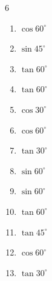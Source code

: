 \begin{multicols}{6}
\begin{enumerate}
  \item $\displaystyle \cos{60^\circ}$


  \item $\displaystyle \sin{45^\circ}$


  \item $\displaystyle \tan{60^\circ}$


  \item $\displaystyle \tan{60^\circ}$


  \item $\displaystyle \cos{30^\circ}$


  \item $\displaystyle \cos{60^\circ}$


\columnbreak %

  \item $\displaystyle \tan{30^\circ}$


  \item $\displaystyle \sin{60^\circ}$


  \item $\displaystyle \sin{60^\circ}$


  \item $\displaystyle \tan{60^\circ}$


  \item $\displaystyle \tan{45^\circ}$

        \phantom{$\displaystyle =1$}

  \item $\displaystyle \cos{60^\circ}$


  \item $\displaystyle \tan{30^\circ}$


\end{enumerate}
\end{multicols}
